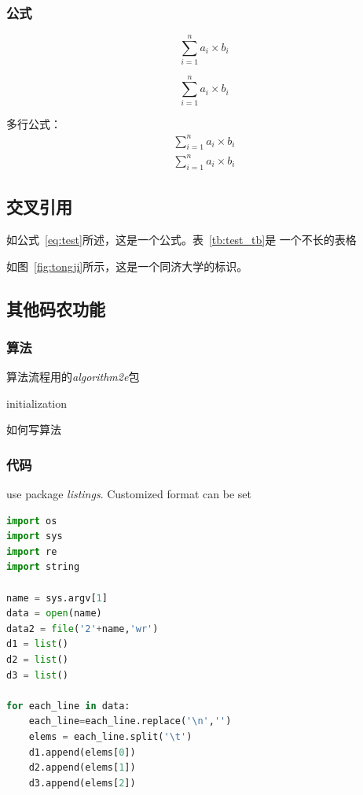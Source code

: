 \subsubsection{公式}
	\begin{equation}\label{eq:test}
	\sum_{i=1}^n a_i \times b_i 
	\end{equation}
	
	\begin{equation}
		\sum_{i=1}^n a_i \times b_i 
		\end{equation}
		
	多行公式：
	\begin{eqnarray}
			\sum_{i=1}^n a_i \times b_i  \nonumber \\
				\sum_{i=1}^n a_i \times b_i 
	\end{eqnarray}
\subsection{交叉引用}
	如公式~\ref{eq:test}所述，这是一个公式。表~\ref{tb:test_tb}是
	一个不长的表格
	
	如图~\ref{fig:tongji}所示，这是一个同济大学的标识。
	
\subsection{其他码农功能}
\subsubsection{算法}
算法流程用的\textit{algorithm2e}包
\begin{algorithm}
	 initialization\;
	 \caption{如何写算法}
\end{algorithm}

\subsubsection{代码}
use package \textit{listings}. Customized format can be set
\lstset{basicstyle=\ttfamily\small ,frame=single,captionpos=t}
%
\begin{lstlisting}[language=Python, caption=一段python代码] 
import os
import sys
import re
import string

name = sys.argv[1]
data = open(name)
data2 = file('2'+name,'wr')
d1 = list()
d2 = list()
d3 = list()

for each_line in data:
	each_line=each_line.replace('\n','')
	elems = each_line.split('\t')
	d1.append(elems[0])
	d2.append(elems[1])
	d3.append(elems[2])
\end{lstlisting}



